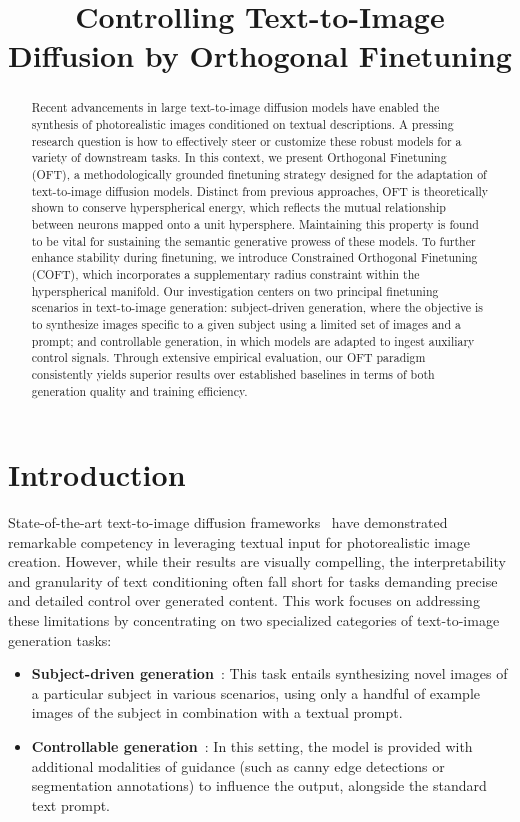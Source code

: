 \title{Controlling Text-to-Image Diffusion by Orthogonal Finetuning}

\begin{abstract}
Recent advancements in large text-to-image diffusion models have enabled the synthesis of photorealistic images conditioned on textual descriptions. A pressing research question is how to effectively steer or customize these robust models for a variety of downstream tasks. In this context, we present Orthogonal Finetuning (OFT), a methodologically grounded finetuning strategy designed for the adaptation of text-to-image diffusion models. Distinct from previous approaches, OFT is theoretically shown to conserve hyperspherical energy, which reflects the mutual relationship between neurons mapped onto a unit hypersphere. Maintaining this property is found to be vital for sustaining the semantic generative prowess of these models. To further enhance stability during finetuning, we introduce Constrained Orthogonal Finetuning (COFT), which incorporates a supplementary radius constraint within the hyperspherical manifold. Our investigation centers on two principal finetuning scenarios in text-to-image generation: subject-driven generation, where the objective is to synthesize images specific to a given subject using a limited set of images and a prompt; and controllable generation, in which models are adapted to ingest auxiliary control signals. Through extensive empirical evaluation, our OFT paradigm consistently yields superior results over established baselines in terms of both generation quality and training efficiency.
\end{abstract}

\section{Introduction}

State-of-the-art text-to-image diffusion frameworks~\cite{saharia2022photorealistic,ramesh2022hierarchical,rombach2022high} have demonstrated remarkable competency in leveraging textual input for photorealistic image creation. However, while their results are visually compelling, the interpretability and granularity of text conditioning often fall short for tasks demanding precise and detailed control over generated content. This work focuses on addressing these limitations by concentrating on two specialized categories of text-to-image generation tasks:

\begin{itemize}[leftmargin=*,nosep]

    \item \textbf{Subject-driven generation}~\cite{ruiz2023dreambooth}: This task entails synthesizing novel images of a particular subject in various scenarios, using only a handful of example images of the subject in combination with a textual prompt.
    \item \textbf{Controllable generation}~\cite{zhang2023adding,mou2023t2i}: In this setting, the model is provided with additional modalities of guidance (such as canny edge detections or segmentation annotations) to influence the output, alongside the standard text prompt.
\end{itemize}

